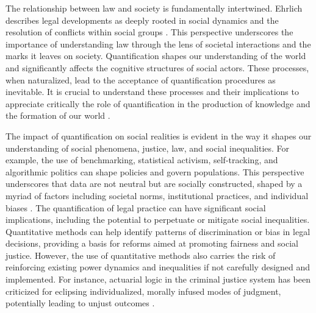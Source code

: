 The relationship between law and society is fundamentally intertwined. Ehrlich describes legal developments as deeply rooted in social dynamics and the resolution of conflicts within social groups \cite{ehrlich1967fundamentos}. This perspective underscores the importance of understanding law through the lens of societal interactions and the marks it leaves on society. Quantification shapes our understanding of the world and significantly affects the cognitive structures of social actors. These processes, when naturalized, lead to the acceptance of quantification procedures as inevitable. It is crucial to understand these processes and their implications to appreciate critically the role of quantification in the production of knowledge and the formation of our world \cite{101057s4159902003965}.

The impact of quantification on social realities is evident in the way it shapes our understanding of social phenomena, justice, law, and social inequalities. For example, the use of benchmarking, statistical activism, self-tracking, and algorithmic politics can shape policies and govern populations. This perspective underscores that data are not neutral but are socially constructed, shaped by a myriad of factors including societal norms, institutional practices, and individual biases \cite{101057s4159902003965}. The quantification of legal practice can have significant social implications, including the potential to perpetuate or mitigate social inequalities. Quantitative methods can help identify patterns of discrimination or bias in legal decisions, providing a basis for reforms aimed at promoting fairness and social justice. However, the use of quantitative methods also carries the risk of reinforcing existing power dynamics and inequalities if not carefully designed and implemented. For instance, actuarial logic in the criminal justice system has been criticized for eclipsing individualized, morally infused modes of judgment, potentially leading to unjust outcomes \cite{101111lsi12334}.

